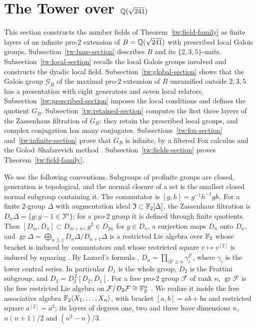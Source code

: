 \section{\texorpdfstring{The Tower over $\mathbb Q(\sqrt{241})$}{The Tower over Q(sqrt 241)}}\label{tw:tower}

This section constructs the number fields of Theorem~\ref{tw:field-family}
as finite layers of an infinite pro-$2$ extension of $B=\mathbb Q(\sqrt{241})$
with prescribed local Galois groups. Subsection~\ref{tw:base-section} describes $B$ and its
$\{2,3,5\}$-units. Subsection~\ref{tw:local-section} recalls the local Galois
groups involved and constructs the dyadic local field.
Subsection~\ref{tw:global-section} shows that the Galois group
$\mathcal G_B$ of the maximal pro-$2$ extension of $B$ unramified outside
$2,3,5$ has a presentation with eight generators and seven local relators.
Subsection~\ref{tw:prescribed-section} imposes the local conditions and
defines the quotient $G_B$. Subsection~\ref{tw:retained-section} computes the
first three layers of the Zassenhaus filtration of $G_B$: they retain the
prescribed local groups, and complex conjugation has many conjugates.
Subsections~\ref{tw:fox-section} and~\ref{tw:infinite-section} prove that
$G_B$ is infinite, by a filtered Fox calculus and the Golod--Shafarevich
method \cite{GolodShafarevich}.
Subsection~\ref{tw:fields-section} proves Theorem~\ref{tw:field-family}.

We use the following conventions. Subgroups of profinite groups are closed,
generation is topological, and the normal closure of a set is the smallest
closed normal subgroup containing it. The commutator is
$[g,h]=g^{-1}h^{-1}gh$. For a finite $2$-group $\Delta$ with augmentation
ideal $\mathfrak I\subset\mathbb F_2[\Delta]$, the Zassenhaus filtration is
$D_n\Delta=\{g:g-1\in\mathfrak I^n\}$; for a pro-$2$ group it is defined
through finite quotients. Then $[D_m,D_n]\subset D_{m+n}$, $g^2\in D_{2n}$
for $g\in D_n$, a surjection maps $D_n$ onto $D_n$, and
$\operatorname{gr}\Delta=\bigoplus_{n\ge1}D_n\Delta/D_{n+1}\Delta$ is a
restricted Lie algebra over $\mathbb F_2$ whose bracket is induced by commutators
and whose restricted square $v\mapsto v^{[2]}$ is induced by squaring
\cite{Jennings,Quillen,Ershov2012}. By Lazard's formula
\cite[Proposition~3.2]{Ershov2012}, $D_n=\prod_{i2^j\ge n}\gamma_i^{2^j}$,
where $\gamma_i$ is the lower central series. In particular $D_1$ is the
whole group, $D_2$ is the Frattini subgroup, and $D_3=D_2^{\,2}[D_2,D_1]$. For
a free pro-$2$ group $\mathcal F$ of rank $n$, $\operatorname{gr}\mathcal F$
is the free restricted Lie algebra on $\mathcal F/D_2\mathcal F\cong\mathbb F_2^n$
\cite{Quillen,Ershov2012}. We realize it inside the free associative
algebra $\mathbb F_2\langle X_1,\dots,X_n\rangle$, with bracket $[a,b]=ab+ba$ and
restricted square $a^{[2]}=a^2$; its layers of degrees one, two and three
have dimensions $n$, $n(n+1)/2$ and $(n^3-n)/3$.

